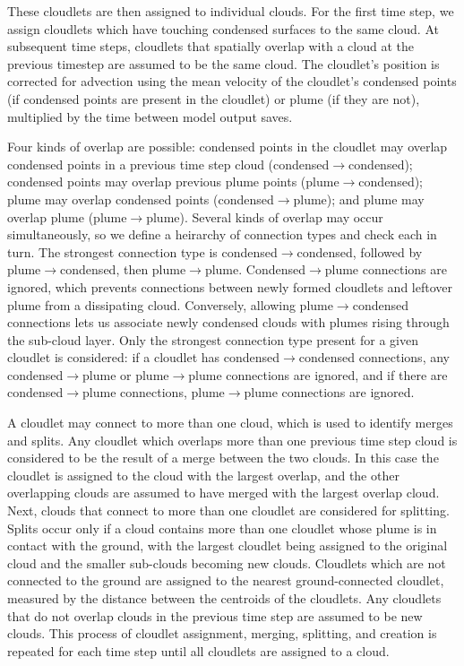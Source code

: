 \documentclass[acp]{copernicus}
\begin{document}
These cloudlets are then assigned to individual clouds.  For the first time 
step, we assign cloudlets which have touching condensed surfaces to the same 
cloud.  At subsequent time steps, cloudlets that spatially overlap with a cloud 
at the previous timestep are assumed to be the same cloud.  The cloudlet's 
position is corrected for advection using the mean velocity of the cloudlet's 
condensed points (if condensed points are present in the cloudlet) or plume 
(if they are not), multiplied by the time between model output saves.

Four kinds of overlap are possible: condensed points in the cloudlet may 
overlap condensed points in a previous time step cloud 
(condensed$\rightarrow$condensed); condensed points may overlap previous plume 
points (plume$\rightarrow$condensed); plume may overlap condensed points 
(condensed$\rightarrow$plume); and plume may overlap plume 
(plume$\rightarrow$plume).  Several kinds of overlap may occur simultaneously, 
so we define a heirarchy of connection types and check each in turn.  The 
strongest connection type is condensed$\rightarrow$condensed, followed by 
plume$\rightarrow$condensed, then plume$\rightarrow$plume.  
Condensed$\rightarrow$plume connections are ignored, which prevents 
connections between newly formed cloudlets and leftover plume from a 
dissipating cloud.  Conversely, allowing plume$\rightarrow$condensed 
connections lets us associate newly condensed clouds with plumes rising through 
the sub-cloud layer.  Only the strongest connection type present for a given 
cloudlet is considered: if a cloudlet has condensed$\rightarrow$condensed 
connections, any condensed$\rightarrow$plume or plume$\rightarrow$plume 
connections are ignored, and if there are condensed$\rightarrow$plume 
connections, plume$\rightarrow$plume connections are ignored.  

A cloudlet may connect to more than one cloud, which is used to identify 
merges and splits.  Any cloudlet which overlaps more than one previous time 
step cloud is considered to be the result of a merge between the two clouds.  
In this case the cloudlet is assigned to the cloud with the largest overlap, 
and the other overlapping clouds are assumed to have merged with the largest 
overlap cloud.  Next, clouds that connect to more than one cloudlet are 
considered for splitting.  Splits occur only if a cloud contains more than one 
cloudlet whose plume is in contact with the ground, with the largest cloudlet 
being assigned to the original cloud and the smaller sub-clouds becoming new 
clouds.  Cloudlets which are not connected to the ground are assigned to the 
nearest ground-connected cloudlet, measured by the distance between the 
centroids of the cloudlets.  Any cloudlets that do not overlap clouds in the 
previous time step are assumed to be new clouds.  This process of cloudlet 
assignment, merging, splitting, and creation is repeated for each time step 
until all cloudlets are assigned to a cloud.
  
\end{document}
